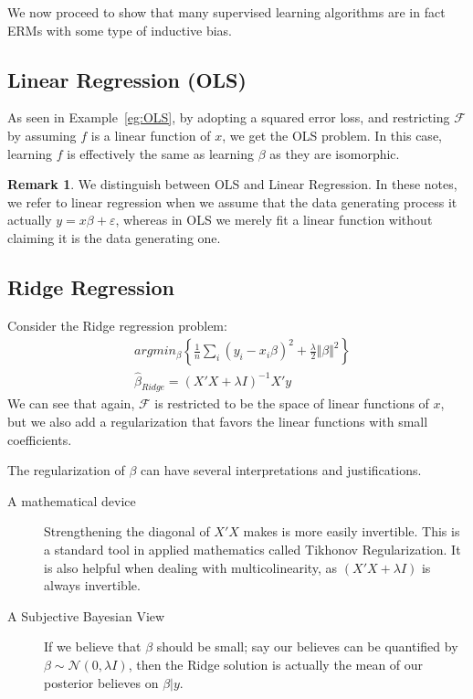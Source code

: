 \documentclass[12pt,a4paper]{article}
\theoremstyle{plain}
\theoremstyle{definition}
\newtheorem{remark}{Remark}
\newcommand{\gauss}[1]{\mathcal{N}(#1)}
\newcommand{\norm}[1]{\Vert #1 \Vert}
\newcommand{\argmin}[2]{argmin_{#1}\left\{ #2 \right\}}
\newcommand{\hyp}{f}
\newcommand{\hypclass}{\mathcal{F}}
\begin{document}
We now proceed to show that many supervised learning algorithms are in fact ERMs with some type of inductive bias.

\subsection{Linear Regression (OLS)}
\label{sec:ols}
As seen in Example~\ref{eg:OLS}, by adopting a squared error loss, and restricting $\hypclass$ by assuming $\hyp$ is a linear function of $x$, we get the OLS problem.
In this case, learning $\hyp$ is effectively the same as learning $\beta$ as they are isomorphic.

\begin{remark}
We distinguish between OLS and Linear Regression. In these notes, we refer to linear regression when we assume that the data generating process it actually $y=x\beta+\varepsilon$, whereas in OLS we merely fit a linear function without claiming it is the data generating one.
\end{remark}



\subsection{Ridge Regression}
Consider the Ridge regression problem:
\begin{align}
\label{eq:ridge}
	& \argmin{\beta}{\frac{1}{n}\sum_i (y_i-x_i\beta)^2 + \frac{\lambda}{2}\norm{\beta}^2} \\
	& \hat{\beta}_{Ridge}= (X'X+\lambda I)^{-1} X'y
\end{align}
We can see that again, $\hypclass$ is restricted to be the space of linear functions of $x$, but we also add a regularization that favors the linear functions with small coefficients.

The regularization of $\beta$ can have several interpretations and justifications.
\begin{description}
\item[A mathematical device] Strengthening the diagonal of $X'X$ makes is more easily invertible. This is a standard tool in applied mathematics called Tikhonov Regularization. It is also helpful when dealing with multicolinearity, as $(X'X+\lambda I)$ is always invertible.
\item[A Subjective Bayesian View] If we believe that $\beta$ should be small; say our believes can be quantified by $\beta \sim \gauss{0,\lambda I}$, then the Ridge solution is actually the mean of our posterior believes on $\beta|y$.
\end{description}
\end{document}
